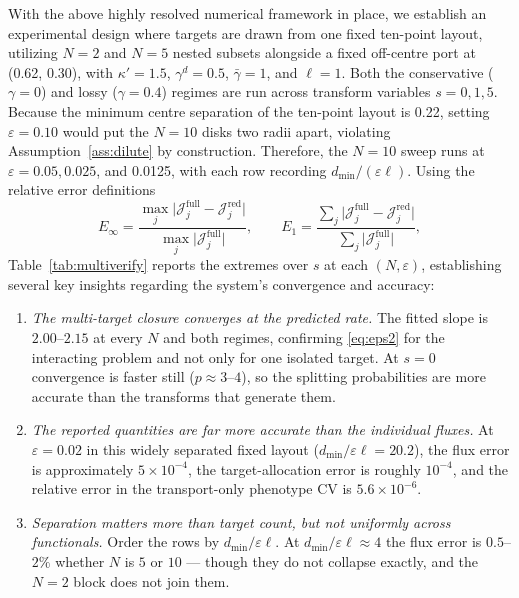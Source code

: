 \documentclass[pdflatex,sn-mathphys-num]{sn-jnl}
\numberwithin{equation}{section}
\theoremstyle{thmstyleone}%
\theoremstyle{definition}
\theoremstyle{remark}
\begin{document}
With the above highly resolved numerical framework in place, we establish an experimental design where targets are drawn from one fixed ten-point layout, utilizing $N=2$ and $N=5$ nested subsets alongside a fixed off-centre port at (0.62, 0.30), with $\kappa'=1.5$, $\gamma^d=0.5$, $\bar\gamma=1$, and $\ell=1$. Both the conservative ($\gamma=0$) and lossy ($\gamma=0.4$) regimes are run across transform variables $s=0, 1, 5$. Because the minimum centre separation of the ten-point layout is 0.22, setting $\varepsilon=0.10$ would put the $N=10$ disks two radii apart, violating Assumption~\ref{ass:dilute} by construction. Therefore, the $N=10$ sweep runs at $\varepsilon=0.05, 0.025$, and 0.0125, with each row recording $d_{\min}/(\varepsilon\ell)$. Using the relative error definitions$$E_\infty=\frac{\max_j\vert{}\mathcal J^{\mathrm{full}}_j-\mathcal J^{\mathrm{red}}_j\vert{}}{\max_j\vert{}\mathcal J^{\mathrm{full}}_j\vert{}},\qquad E_1=\frac{\sum_j\vert{}\mathcal J^{\mathrm{full}}_j-\mathcal J^{\mathrm{red}}_j\vert{}}{\sum_j\vert{}\mathcal J^{\mathrm{full}}_j\vert{}},\label{eq:pdeerr}$$
Table~\ref{tab:multiverify} reports the extremes over $s$ at each $(N,\varepsilon)$, establishing several key insights regarding the system's convergence and accuracy:
\begin{enumerate}[label=(\roman*)]
\item \emph{The multi-target closure converges at the predicted rate.} The
fitted slope is $2.00$--$2.15$ at every $N$ and both regimes, confirming
\eqref{eq:eps2} for the interacting problem and not only for one isolated
target. At $s=0$ convergence is faster still ($p\approx3$--$4$), so the
splitting probabilities are more accurate than the transforms that generate them.
\item \emph{The reported quantities are far more accurate than the individual fluxes.} At $\varepsilon=0.02$ in this widely separated fixed layout ($d_{\min}/\varepsilon\ell=20.2$), the flux error is approximately $5\times10^{-4}$, the target-allocation error is roughly $10^{-4}$, and the relative error in the transport-only phenotype CV is $5.6\times10^{-6}$.
\item \emph{Separation matters more than target count, but not uniformly across
functionals.} Order the rows by $d_{\min}/\varepsilon\ell$. 
At $d_{\min}/\varepsilon\ell\approx4$ the flux error is $0.5$--$2\%$ whether $N$ is
$5$ or $10$ --- though they do not collapse exactly, and the $N=2$ block does not
join them. 
\end{enumerate}
\end{document}
